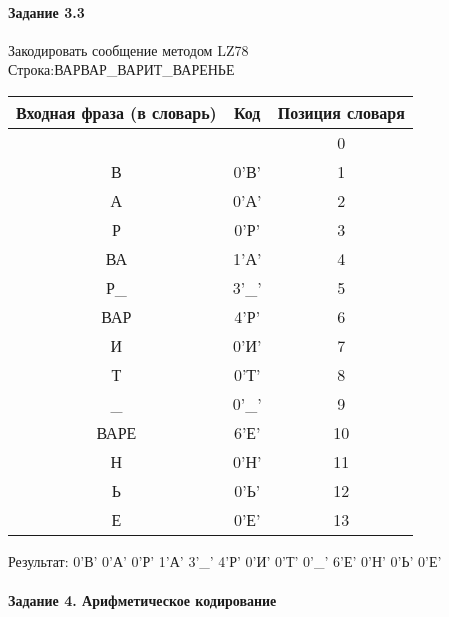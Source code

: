 \documentclass[a4paper, 12pt]{article}
\begin{document}
\paragraph{Задание 3.3}

Закодировать сообщение методом LZ78\\
Строка:ВАРВАР\_ВАРИТ\_ВАРЕНЬЕ\\
\begin{table}[h!]
\centering
\begin{tabular}{|c|c|c|} 
\hline
 Входная фраза (в словарь) & Код & Позиция словаря \\ \hline

 &  & 0 \\ \hline
В & 0'В' & 1 \\ \hline
А & 0'А' & 2 \\ \hline
Р & 0'Р' & 3 \\ \hline
ВА & 1'А' & 4 \\ \hline
Р\_ & 3'\_' & 5 \\ \hline
ВАР & 4'Р' & 6 \\ \hline
И & 0'И' & 7 \\ \hline
Т & 0'Т' & 8 \\ \hline
\_ & 0'\_' & 9 \\ \hline
ВАРЕ & 6'Е' & 10 \\ \hline
Н & 0'Н' & 11 \\ \hline
Ь & 0'Ь' & 12 \\ \hline
Е & 0'Е' & 13 \\ \hline
\end{tabular}
\end{table}

Результат: 0'В' 0'А' 0'Р' 1'А' 3'\_' 4'Р' 0'И' 0'Т' 0'\_' 6'Е' 0'Н' 0'Ь' 0'Е'\\
\pagebreak
\paragraph{Задание 4. Арифметическое кодирование\\}
\end{document}
